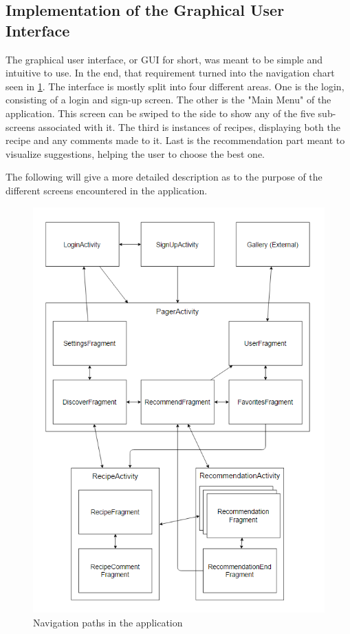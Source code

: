 \subsection{Implementation of the Graphical User Interface}
\label{subsec:implgui}

The graphical user interface, or GUI for short, was meant to be simple and intuitive to use. In the end, that requirement turned into the navigation chart seen in \ref{fig:application_navigation}. The interface is mostly split into four different areas. One is the login, consisting of a login and sign-up screen. The other is the "Main Menu" of the application. This screen can be swiped to the side to show any of the five sub-screens associated with it. The third is instances of recipes, displaying both the recipe and any comments made to it. Last is the recommendation part meant to visualize suggestions, helping the user to choose the best one.

The following will give a more detailed description as to the purpose of the different screens encountered in the application.

\begin{figure}[H]
	\centering
	\includegraphics[width=\textwidth]{Pictures/application_navigation.png}
	\caption{Navigation paths in the application}
	\label{fig:application_navigation}
\end{figure}

